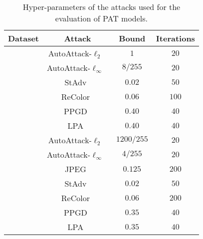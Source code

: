 \documentclass[runningheads]{llncs}
\begin{document}
\begin{table}[htp]
	\caption{Hyper-parameters of the attacks used for the evaluation of PAT models.}
	\label{tab:hyper_PAT}
	\begin{center}
		\begin{small}
			\setlength\tabcolsep{1.6pt}
			\begin{tabular}{cccc}
				\toprule
				\textbf{\scriptsize{Dataset}}
				& \textbf{Attack}
				& \textbf{Bound}
				& \textbf{Iterations} \\
				\midrule
				\parbox[t]{2mm}{}
				& AutoAttack-$\ell_2$~\cite{croce2020autoattack}                   & $1$	           & $20$ \\
				& AutoAttack-$\ell_\infty$~\cite{croce2020autoattack}              & $8/255$	       & $20$ \\
				& StAdv~\cite{xiao2018stadv}                                       & $0.02$	       & $50$ \\
				& ReColor~\cite{laidlaw2019recolor}                                & $0.06$	       & $100$ \\
				& PPGD~\cite{laidlaw2021pat}                                       & $0.40$	       & $40$ \\
				& LPA~\cite{laidlaw2021pat}                                        & $0.40$	       & $40$ \\                     
				\midrule
				\parbox[t]{2mm}{}
				& AutoAttack-$\ell_2$~\cite{croce2020autoattack}                   & $1200/255$	   & $20$ \\
				& AutoAttack-$\ell_\infty$~\cite{croce2020autoattack}              & $4/255$	       & $20$ \\
				& JPEG~\cite{kang2019JPEG}                                         & $0.125$	       & $200$ \\
				& StAdv~\cite{xiao2018stadv}                                       & $0.02$	       & $50$ \\
				& ReColor~\cite{laidlaw2019recolor}                                & $0.06$	       & $200$ \\
				& PPGD~\cite{laidlaw2021pat}                                       & $0.35$	       & $40$ \\
				& LPA~\cite{laidlaw2021pat}                                        & $0.35$	       & $40$ \\
				\bottomrule
			\end{tabular}
		\end{small}
	\end{center}
\end{table}
\end{document}
